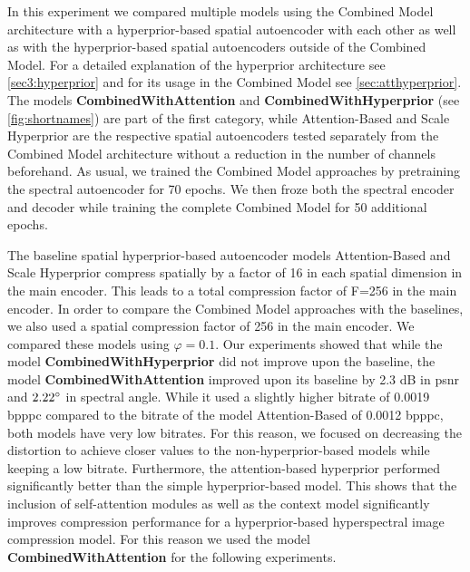 In this experiment we compared multiple models using the Combined Model architecture with a hyperprior-based spatial autoencoder with each other as well as with the hyperprior-based spatial autoencoders outside of the Combined Model. For a detailed explanation of the hyperprior architecture see \autoref{sec3:hyperprior} and for its usage in the Combined Model see \autoref{sec:atthyperprior}. The models \textbf{CombinedWithAttention} and \textbf{CombinedWithHyperprior} (see \autoref{fig:shortnames}) are part of the first category, while Attention-Based and Scale Hyperprior are the respective spatial autoencoders tested separately from the Combined Model architecture without a reduction in the number of channels beforehand. As usual, we trained the Combined Model approaches by pretraining the spectral autoencoder for 70 epochs. We then froze both the spectral encoder and decoder while training the complete Combined Model for 50 additional epochs.

The baseline spatial hyperprior-based autoencoder models Attention-Based \citep{cheng_learned_2020} and Scale Hyperprior \citep{balle_variational_2018} compress spatially by a factor of 16 in each spatial dimension in the main encoder. This leads to a total compression factor of F=256 in the main encoder. In order to compare the Combined Model approaches with the baselines, we also used a spatial compression factor of 256 in the main encoder. We compared these models using $\varphi=0.1$. Our experiments showed that while the model \textbf{CombinedWithHyperprior} did not improve upon the baseline, the model \textbf{CombinedWithAttention} improved upon its baseline by 2.3 dB in \ac{psnr} and $2.22 \degree$ in spectral angle. While it used a slightly higher bitrate of 0.0019 \ac{bpppc} compared to the bitrate of the model Attention-Based of 0.0012 \ac{bpppc}, both models have very low bitrates. For this reason, we focused on decreasing the distortion to achieve closer values to the non-hyperprior-based models while keeping a low bitrate. Furthermore, the attention-based hyperprior performed significantly better than the simple hyperprior-based model. This shows that the inclusion of self-attention modules as well as the context model significantly improves compression performance for a hyperprior-based hyperspectral image compression model. For this reason we used the model \textbf{CombinedWithAttention} for the following experiments.

